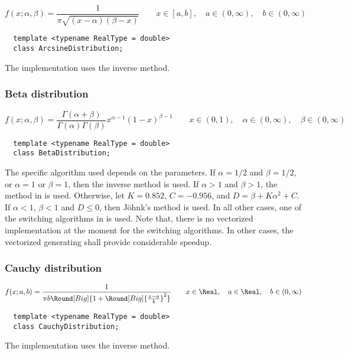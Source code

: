 \begin{equation*}
  f(x;\alpha,\beta) = \frac{1}{\pi\sqrt{(x - \alpha)(\beta - x)}} \qquad
  x \in [a, b],\quad a \in (0,\infty),\quad b \in (0,\infty)
\end{equation*}
\begin{Verbatim}
  template <typename RealType = double>
  class ArcsineDistribution;
\end{Verbatim}
The implementation uses the inverse method.

\subsubsection{Beta distribution}

\begin{equation*}
  f(x;\alpha,\beta) =
  \frac{\Gamma(\alpha + \beta)}{\Gamma(\alpha)\Gamma(\beta)}
  x^{\alpha - 1}(1 - x)^{\beta - 1} \qquad
  x \in (0, 1),\quad \alpha \in (0,\infty),\quad \beta \in (0,\infty)
\end{equation*}
\begin{Verbatim}
  template <typename RealType = double>
  class BetaDistribution;
\end{Verbatim}
The specific algorithm used depends on the parameters. If $\alpha = 1/2$ and
$\beta = 1/2$, or $\alpha = 1$ or $\beta = 1$, then the inverse method is used.
If $\alpha > 1$ and $\beta > 1$, the method in \cite{Cheng:1978jl} is used.
Otherwise, let $K = 0.852$, $C = -0.956$, and $D = \beta + K\alpha^2 + C$. If
$\alpha < 1$, $\beta < 1$ and $D \le 0$, then Jöhnk's method
\parencite[sec.~3.5]{Devroye:1986gi} is used. In all other cases, one of the
switching algorithms in \textcite{Atkinson:1979es} is used. Note that, there is
no vectorized implementation at the moment for the switching algorithms. In
other cases, the vectorized generating shall provide considerable speedup.

\subsubsection{Cauchy distribution}

\begin{equation*}
  f(x;a,b) =
  \frac{1}{\pi b\Round[Big]{1 + \Round[Big]{\frac{x - a}{b}}^2}} \qquad
  x \in \Real,\quad a \in \Real,\quad b \in (0,\infty)
\end{equation*}
\begin{Verbatim}
  template <typename RealType = double>
  class CauchyDistribution;
\end{Verbatim}
The implementation uses the inverse method.

